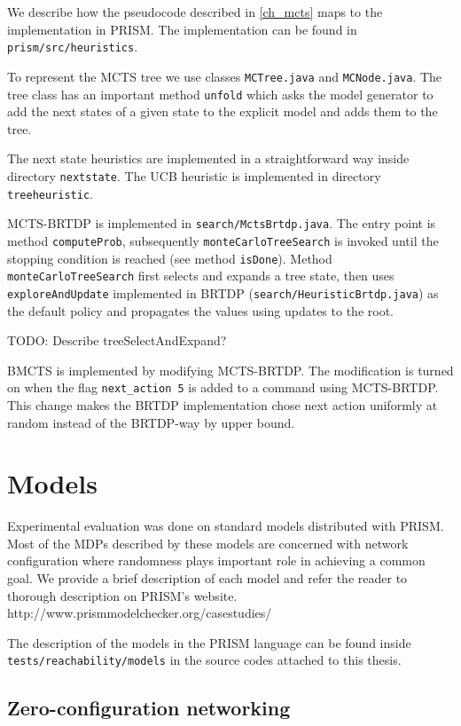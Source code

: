 We describe how the pseudocode described in \autoref{ch_mcts} maps to
the implementation in PRISM. The implementation can be found in
\verb|prism/src/heuristics|.

To represent the MCTS tree we use classes \verb|MCTree.java| and
\linebreak
\verb|MCNode.java|. The tree class has an important method \verb|unfold|
which asks the model generator to add the next states of a given state
to the explicit model and adds them to the tree.

The next state heuristics are implemented in a straightforward way
inside directory \verb|nextstate|. The UCB heuristic is implemented in
directory \verb|treeheuristic|.

MCTS-BRTDP is implemented in \verb|search/MctsBrtdp.java|. The entry
point is method \verb|computeProb|, subsequently
\verb|monteCarloTreeSearch| is invoked until the stopping condition
is reached (see method \verb|isDone|). Method
\verb|monteCarloTreeSearch| first selects and expands a tree state,
then uses \verb|exploreAndUpdate| implemented in BRTDP
(\verb|search/HeuristicBrtdp.java|) as the default policy and propagates
the values using updates to the root.

TODO: Describe treeSelectAndExpand?

BMCTS is implemented by modifying MCTS-BRTDP. The modification is turned
on when the flag \verb|next_action 5| is added to a command using
MCTS-BRTDP. This change makes the BRTDP implementation chose next action
uniformly at random instead of the BRTDP-way by upper bound.

\section{Models}

Experimental evaluation was done on standard models
distributed with PRISM. Most of the MDPs described by these models are
concerned with network configuration where randomness plays important
role in achieving a common goal. We provide a brief description of each
model and refer the reader to thorough description on PRISM's website.
http://www.prismmodelchecker.org/casestudies/

The description of the models in the PRISM language can be found inside
\verb|tests/reachability/models| in the source codes attached to this
thesis.

\subsection*{Zero-configuration networking}

